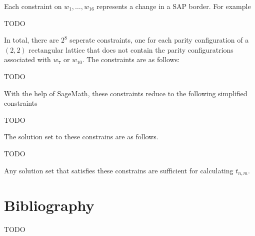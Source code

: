 \documentclass[12pt]{article}
\theoremstyle{plain}
\theoremstyle{definition}
\theoremstyle{remark}
\theoremstyle{definition}
\begin{document}
Each constraint on $w_{1},\dots,w_{16}$ represents a change in a SAP border. For example

TODO

In total, there are $2^8$ seperate constraints, one for each parity configuration of a $(2,2)$ rectangular lattice that does not contain the parity configuratrions associated with $w_{7}$ or $w_{10}$. The constraints are as follows:

TODO

With the help of SageMath, these constraints reduce to the following simplified constraints

TODO

The solution set to these constrains are as follows.

TODO

Any solution set that satisfies these constrains are sufficient for calculating $t_{n,m}$.

\section{Bibliography}

TODO
\end{document}
